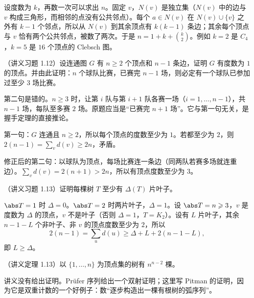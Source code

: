 \begin{remark}
设度数为 $k$，再数一次可以求出 $n$。固定 $v$，$N(v)$ 是独立集（$N(v)$ 中的边与 $v$ 构成三角形，而相邻的点没有公共邻点）。每个 $a\in N(v)$ 在 $N(v)\cup\{v\}$ 之外有 $k-1$ 个邻点，所以从 $N(v)$ 到其余顶点有 $k(k-1)$ 条边；其余每个顶点与 $v$ 恰有两个公共邻点，被数了两次。于是 $n=1+k+\binom k2$。例如 $k=2$ 是 $C_4$，$k=5$ 是 $16$ 个顶点的 Clebsch 图。
\end{remark}

\begin{workedexample}\label{we:double-counting:games}
（讲义习题 1.12）设连通图 $G$ 有 $n\geqslant2$ 个顶点和 $n-1$ 条边，证明 $G$ 有度数为 $1$ 的顶点。并由此证明：$n$ 个球队比赛，已赛完 $n-1$ 场，则必定有一个球队已参加过至少 $3$ 场比赛。
\end{workedexample}
\begin{remark}[讲义原题有误]
第二句是错的。$n\geqslant3$ 时，让第 $i$ 队与第 $i+1$ 队各赛一场（$i=1,\dots,n-1$），共 $n-1$ 场，每队至多赛 $2$ 场。原题应当是“已赛完 $n+1$ 场”。它与第一句无关，是握手定理的直接推论。
\end{remark}
\begin{solution}
第一句：$G$ 连通且 $n\geqslant2$，所以每个顶点的度数至少为 $1$。若都至少为 $2$，则 $2(n-1)=\sum_vd(v)\geqslant2n$，矛盾。

修正后的第二句：以球队为顶点，每场比赛连一条边（同两队若赛多场就连重边）。$\sum_vd(v)=2(n+1)>2n$，所以有顶点度数至少为 $3$。
\end{solution}

\begin{workedexample}\label{we:double-counting:leaves}
（讲义习题 1.13）证明每棵树 $T$ 至少有 $\Delta(T)$ 片叶子。
\end{workedexample}
\begin{solution}
$\abs T=1$ 时 $\Delta=0$。$\abs T=2$ 时两片叶子，$\Delta=1$。设 $\abs T=n\geqslant3$，$v$ 是度数为 $\Delta$ 的顶点，$v$ 不是叶子（否则 $\Delta=1$，$T=K_2$）。设有 $L$ 片叶子，其余 $n-1-L$ 个非叶子、非 $v$ 的顶点度数至少为 $2$，所以
\[
2(n-1)=\sum_ud(u)\geqslant\Delta+L+2(n-1-L),
\]
即 $L\geqslant\Delta$。
\end{solution}

\begin{theorem}[Cayley 公式]\label{thm:double-counting:cayley}
（讲义定理 1.13）以 $\{1,\dots,n\}$ 为顶点集的树有 $n^{n-2}$ 棵。
\end{theorem}

讲义没有给出证明。Prüfer 序列给出一个双射证明；这里写 Pitman 的证明，因为它是双重计数的一个好例子：数“逐步构造出一棵有根树的弧序列”。

